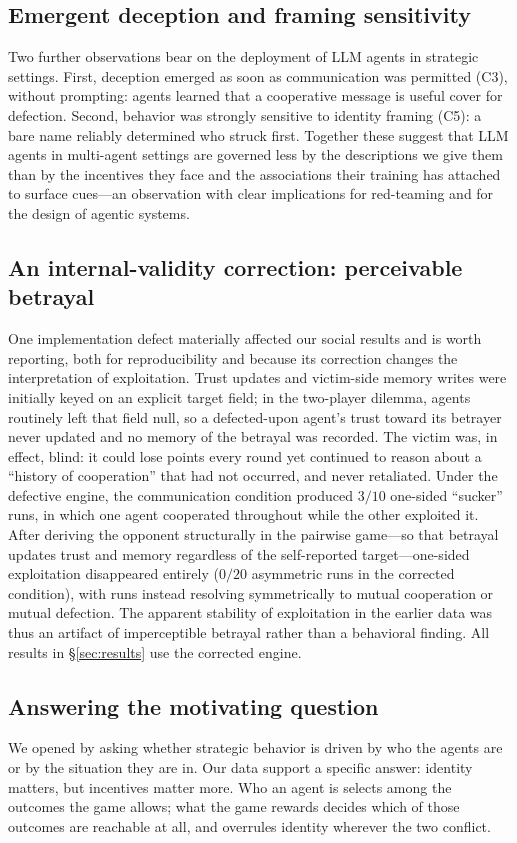 \subsection{Emergent deception and framing sensitivity}
Two further observations bear on the deployment of LLM agents in strategic settings. First, deception emerged as soon as communication was permitted (C3), without prompting: agents learned that a cooperative message is useful cover for defection. Second, behavior was strongly sensitive to identity framing (C5): a bare name reliably determined who struck first. Together these suggest that LLM agents in multi-agent settings are governed less by the descriptions we give them than by the incentives they face and the associations their training has attached to surface cues---an observation with clear implications for red-teaming and for the design of agentic systems.

\subsection{An internal-validity correction: perceivable betrayal}
\label{sec:discussion-validity}
One implementation defect materially affected our social results and is worth reporting, both for reproducibility and because its correction changes the interpretation of exploitation. Trust updates and victim-side memory writes were initially keyed on an explicit target field; in the two-player dilemma, agents routinely left that field null, so a defected-upon agent's trust toward its betrayer never updated and no memory of the betrayal was recorded. The victim was, in effect, blind: it could lose points every round yet continued to reason about a ``history of cooperation'' that had not occurred, and never retaliated. Under the defective engine, the communication condition produced $3/10$ one-sided ``sucker'' runs, in which one agent cooperated throughout while the other exploited it. After deriving the opponent structurally in the pairwise game---so that betrayal updates trust and memory regardless of the self-reported target---one-sided exploitation disappeared entirely ($0/20$ asymmetric runs in the corrected condition), with runs instead resolving symmetrically to mutual cooperation or mutual defection. The apparent stability of exploitation in the earlier data was thus an artifact of imperceptible betrayal rather than a behavioral finding. All results in \S\ref{sec:results} use the corrected engine.

\subsection{Answering the motivating question}
We opened by asking whether strategic behavior is driven by who the agents are or by the situation they are in. Our data support a specific answer: identity matters, but incentives matter more. Who an agent is selects among the outcomes the game allows; what the game rewards decides which of those outcomes are reachable at all, and overrules identity wherever the two conflict.

